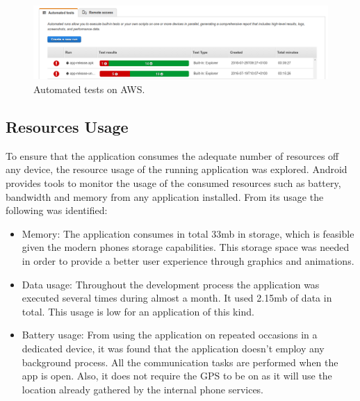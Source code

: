 \begin{figure}[H]
\begin{adjustbox}{width=1\textwidth,center=\textwidth}
  \centering
  \includegraphics[scale=1]{images/automated_tests.png}
\end{adjustbox}
  \caption[Automated tests on AWS]{Automated tests on AWS.}
  \label{fig:automated_tests}
\end{figure}

\subsection{Resources Usage}
To ensure that the application consumes the adequate number of resources off any device, the resource usage of the running application was explored. Android provides tools to monitor the usage of the consumed resources such as battery, bandwidth and memory from any application installed. From its usage the following was identified:
\begin{itemize}
    \item Memory: The application consumes in total 33mb in storage, which is feasible given the modern phones storage capabilities. This storage space was needed in order to provide a better user experience through graphics and animations.
    \item Data usage: Throughout the development process the application was executed several times during almost a month. It used 2.15mb of data in total. This usage is low for an application of this kind.
    \item Battery usage: From using the application on repeated occasions in a dedicated device, it was found that the application doesn't employ any background process. All the communication tasks are performed when the app is open. Also, it does not require the GPS to be on as it will use the location already gathered by the internal phone services.
\end{itemize}


